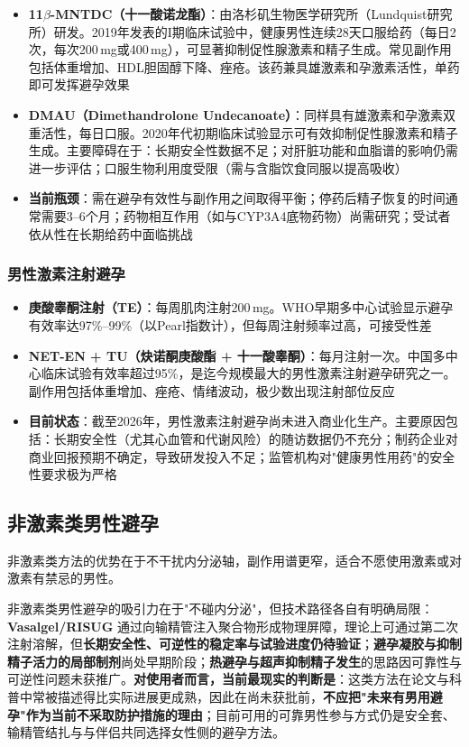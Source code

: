 \begin{itemize}[leftmargin=2cm]
	\item \textbf{11$\beta$-MNTDC（十一酸诺龙酯）}：由洛杉矶生物医学研究所（Lundquist研究所）研发。2019年发表的I期临床试验中，健康男性连续28天口服给药（每日2次，每次200\,mg或400\,mg），可显著抑制促性腺激素和精子生成。常见副作用包括体重增加、HDL胆固醇下降、痤疮。该药兼具雄激素和孕激素活性，单药即可发挥避孕效果
	\item \textbf{DMAU（Dimethandrolone Undecanoate）}：同样具有雄激素和孕激素双重活性，每日口服。2020年代初期临床试验显示可有效抑制促性腺激素和精子生成。主要障碍在于：长期安全性数据不足；对肝脏功能和血脂谱的影响仍需进一步评估；口服生物利用度受限（需与含脂饮食同服以提高吸收）
	\item \textbf{当前瓶颈}：需在避孕有效性与副作用之间取得平衡；停药后精子恢复的时间通常需要3--6个月；药物相互作用（如与CYP3A4底物药物）尚需研究；受试者依从性在长期给药中面临挑战
\end{itemize}

\subsubsection{男性激素注射避孕}

\begin{itemize}[leftmargin=2cm]
	\item \textbf{庚酸睾酮注射（TE）}：每周肌肉注射200\,mg。WHO早期多中心试验显示避孕有效率达97\%--99\%（以Pearl指数计），但每周注射频率过高，可接受性差
	\item \textbf{NET-EN + TU（炔诺酮庚酸酯 + 十一酸睾酮）}：每月注射一次。中国多中心临床试验有效率超过95\%，是迄今规模最大的男性激素注射避孕研究之一。副作用包括体重增加、痤疮、情绪波动，极少数出现注射部位反应
	\item \textbf{目前状态}：截至2026年，男性激素注射避孕尚未进入商业化生产。主要原因包括：长期安全性（尤其心血管和代谢风险）的随访数据仍不充分；制药企业对商业回报预期不确定，导致研发投入不足；监管机构对"健康男性用药"的安全性要求极为严格
\end{itemize}

\subsection{非激素类男性避孕}

非激素类方法的优势在于不干扰内分泌轴，副作用谱更窄，适合不愿使用激素或对激素有禁忌的男性。


非激素类男性避孕的吸引力在于"不碰内分泌"，但技术路径各自有明确局限：\textbf{Vasalgel/RISUG} 通过向输精管注入聚合物形成物理屏障，理论上可通过第二次注射溶解，但\textbf{长期安全性、可逆性的稳定率与试验进度仍待验证}；\textbf{避孕凝胶与抑制精子活力的局部制剂}尚处早期阶段；\textbf{热避孕与超声抑制精子发生}的思路因可靠性与可逆性问题未获推广。\textbf{对使用者而言，当前最现实的判断是}：这类方法在论文与科普中常被描述得比实际进展更成熟，因此在尚未获批前，\textbf{不应把"未来有男用避孕"作为当前不采取防护措施的理由}；目前可用的可靠男性参与方式仍是安全套、输精管结扎与与伴侣共同选择女性侧的避孕方法。

